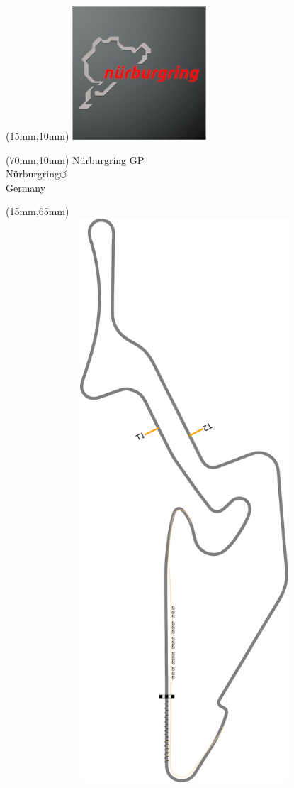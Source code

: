 \null\newpage
\begin{textblock*}{50mm}(15mm,10mm)%
\includegraphics[width=50mm]{LG/2015-05-20_00089.png}
\end{textblock*}
\begin{textblock*}{130mm}(70mm,10mm)%
{\fontsize{20}{20}\selectfont Nürburgring GP\\}
{\fontsize{16}{16}\selectfont Nürburgring\hfill \huge$\circlearrowleft$\\}
{\fontsize{12}{12}\selectfont Germany\\}
\end{textblock*}
\begin{textblock*}{185mm}(15mm,65mm)%
\centering
\mbox{\includegraphics[width=185mm,height=210mm,keepaspectratio]{PT/NBRGP.pdf}}
\end{textblock*}
